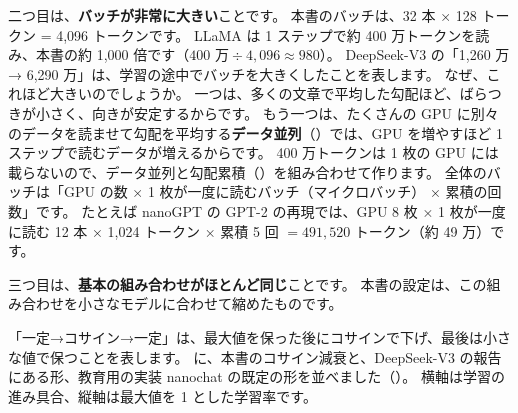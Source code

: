 二つ目は、\textbf{バッチが非常に大きい}ことです。
本書のバッチは、32 本 × 128 トークン = 4,096 トークンです。
LLaMA は 1 ステップで約 400 万トークンを読み、本書の約 1,000 倍です（$400\text{ 万}\div4{,}096\approx980$）。
DeepSeek-V3 の「1,260 万 → 6,290 万」は、学習の途中でバッチを大きくしたことを表します。
なぜ、これほど大きいのでしょうか。
一つは、多くの文章で平均した勾配ほど、ばらつきが小さく、向きが安定するからです。
もう一つは、たくさんの GPU に別々のデータを読ませて勾配を平均する\textbf{データ並列}（）では、GPU を増やすほど 1 ステップで読むデータが増えるからです。
400 万トークンは 1 枚の GPU には載らないので、データ並列と勾配累積（）を組み合わせて作ります。
全体のバッチは「GPU の数 × 1 枚が一度に読むバッチ（マイクロバッチ） × 累積の回数」です。
たとえば nanoGPT の GPT-2 の再現では、GPU 8 枚 × 1 枚が一度に読む 12 本 × 1,024 トークン × 累積 5 回 $=491{,}520$ トークン（約 49 万）です\cite{karpathy2022nanogpt}。

三つ目は、\textbf{基本の組み合わせがほとんど同じ}ことです。
本書の設定は、この組み合わせを小さなモデルに合わせて縮めたものです。

「一定→コサイン→一定」は、最大値を保った後にコサインで下げ、最後は小さな値で保つことを表します。
に、本書のコサイン減衰と、DeepSeek-V3 の報告にある形、教育用の実装 nanochat の既定の形を並べました（）。
横軸は学習の進み具合、縦軸は最大値を 1 とした学習率です。

